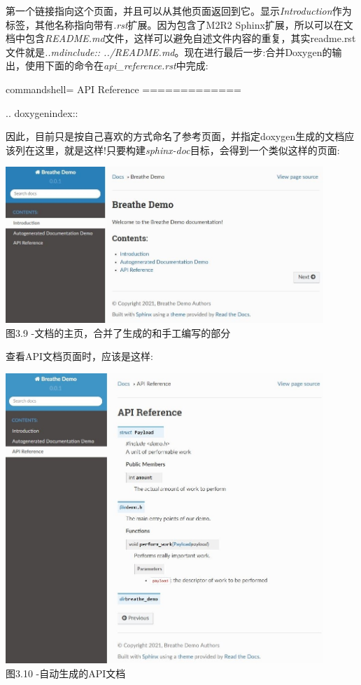 第一个链接指向这个页面，并且可以从其他页面返回到它。显示\textit{Introduction}作为标签，其他名称指向带有\textit{.rst}扩展。因为包含了M2R2 Sphinx扩展，所以可以在文档中包含\textit{README.md}文件，这样可以避免自述文件内容的重复，其实readme.rst文件就是\textit{..mdinclude:: ../README.md}。现在进行最后一步:合并Doxygen的输出，使用下面的命令在\textit{api\_reference.rst}中完成:

\begin{tcblisting}{commandshell={}}
API Reference
=============

.. doxygenindex::

\end{tcblisting}

因此，目前只是按自己喜欢的方式命名了参考页面，并指定doxygen生成的文档应该列在这里，就是这样!只要构建\textit{sphinx-doc}目标，会得到一个类似这样的页面:

\begin{center}
\includegraphics[width=0.9\textwidth]{content/1/chapter3/images/9.jpg}\\
图3.9 -文档的主页，合并了生成的和手工编写的部分
\end{center}

查看API文档页面时，应该是这样:

\begin{center}
\includegraphics[width=0.9\textwidth]{content/1/chapter3/images/10.jpg}\\
图3.10 -自动生成的API文档
\end{center}

